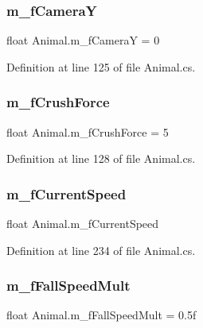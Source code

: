 \subsubsection{\texorpdfstring{m\+\_\+f\+CameraY}{m\_fCameraY}}
{\footnotesize\ttfamily float Animal.\+m\+\_\+f\+CameraY = 0}



Definition at line 125 of file Animal.\+cs.

\mbox{\label{class_animal_a1d872c88c79887ee4d66dfee7e653081}} 
\subsubsection{\texorpdfstring{m\+\_\+f\+Crush\+Force}{m\_fCrushForce}}
{\footnotesize\ttfamily float Animal.\+m\+\_\+f\+Crush\+Force = 5}



Definition at line 128 of file Animal.\+cs.

\mbox{\label{class_animal_a8524e219275547954f825c20f17bbfe0}} 
\subsubsection{\texorpdfstring{m\+\_\+f\+Current\+Speed}{m\_fCurrentSpeed}}
{\footnotesize\ttfamily float Animal.\+m\+\_\+f\+Current\+Speed\hspace{0.3cm}{\ttfamily [protected]}}



Definition at line 234 of file Animal.\+cs.

\mbox{\label{class_animal_a46f6e3823b8f08a423b762437ebc504b}} 
\subsubsection{\texorpdfstring{m\+\_\+f\+Fall\+Speed\+Mult}{m\_fFallSpeedMult}}
{\footnotesize\ttfamily float Animal.\+m\+\_\+f\+Fall\+Speed\+Mult = 0.\+5f}



